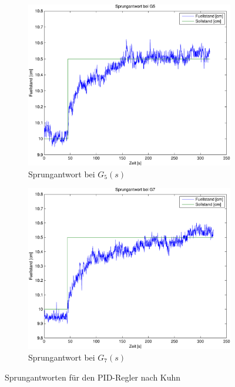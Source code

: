 \begin{figure}[h!]
	\centering
	\begin{subfigure}{0.475\textwidth}
		\includegraphics[width=1\textwidth]{09/step_g5_plot.pdf}
		\caption{Sprungantwort bei $G_5(s)$}
	\end{subfigure}
	\hfill{}
	\begin{subfigure}{0.475\textwidth}
		\includegraphics[width=1\textwidth]{09/step_g7_plot.pdf}
		\caption{Sprungantwort bei $G_7(s)$}
	\end{subfigure}
	\caption{Sprungantworten für den PID-Regler nach Kuhn}
\end{figure}

